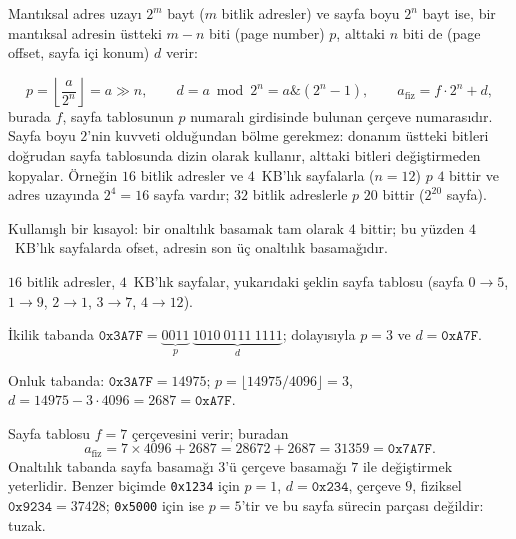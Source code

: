 Mantıksal adres uzayı $2^{m}$ bayt ($m$ bitlik adresler) ve sayfa boyu $2^{n}$ bayt ise, bir mantıksal adresin üstteki $m-n$ biti  (page number) $p$, alttaki $n$ biti de  (page offset, sayfa içi konum) $d$ verir:
\begin{center}
\end{center}
\[
p = \left\lfloor \frac{a}{2^{n}} \right\rfloor = a \gg n, \qquad
d = a \bmod 2^{n} = a \mathbin{\&} (2^{n}-1), \qquad
a_{\text{fiz}} = f \cdot 2^{n} + d,
\]
burada $f$, sayfa tablosunun $p$ numaralı girdisinde bulunan çerçeve numarasıdır. Sayfa boyu $2$'nin kuvveti olduğundan bölme gerekmez: donanım üstteki bitleri doğrudan sayfa tablosunda dizin olarak kullanır, alttaki bitleri değiştirmeden kopyalar. Örneğin $16$ bitlik adresler ve $4$~KB'lık sayfalarla ($n=12$) $p$ $4$ bittir ve adres uzayında $2^{4}=16$ sayfa vardır; $32$ bitlik adreslerle $p$ $20$ bittir ($2^{20}$ sayfa).

Kullanışlı bir kısayol: bir onaltılık basamak tam olarak $4$ bittir; bu yüzden $4$~KB'lık sayfalarda ofset, adresin son üç onaltılık basamağıdır.

\begin{example}
$16$ bitlik adresler, $4$~KB'lık sayfalar, yukarıdaki şeklin sayfa tablosu (sayfa $0\to5$, $1\to9$, $2\to1$, $3\to7$, $4\to12$).

İkilik tabanda $\texttt{0x3A7F} = \underbrace{0011}_{p}\ \underbrace{1010\ 0111\ 1111}_{d}$; dolayısıyla $p = 3$ ve $d = \texttt{0xA7F}$.

Onluk tabanda: $\texttt{0x3A7F} = 14975$; $p = \lfloor 14975/4096 \rfloor = 3$, $d = 14975 - 3\cdot4096 = 2687 = \texttt{0xA7F}$.

Sayfa tablosu $f = 7$ çerçevesini verir; buradan
\[
a_{\text{fiz}} = 7 \times 4096 + 2687 = 28672 + 2687 = 31359 = \texttt{0x7A7F}.
\]
Onaltılık tabanda sayfa basamağı $3$'ü çerçeve basamağı $7$ ile değiştirmek yeterlidir. Benzer biçimde \texttt{0x1234} için $p=1$, $d=\texttt{0x234}$, çerçeve $9$, fiziksel $\texttt{0x9234} = 37428$; \texttt{0x5000} için ise $p = 5$'tir ve bu sayfa sürecin parçası değildir: tuzak.
\end{example}

